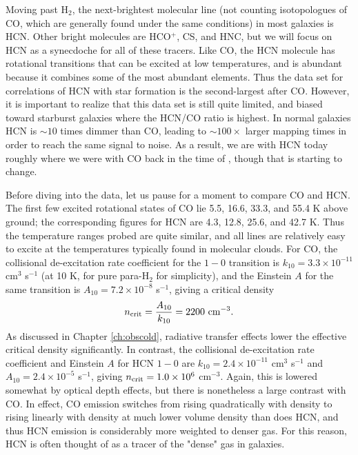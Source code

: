 Moving past H$_2$, the next-brightest molecular line (not counting isotopologues of CO, which are generally found under the same conditions) in most galaxies is HCN. Other bright molecules are HCO$^+$, CS, and HNC, but we will focus on HCN as a synecdoche for all of these tracers. Like CO, the HCN molecule has rotational transitions that can be excited at low temperatures, and is abundant because it combines some of the most abundant elements. Thus the data set for correlations of HCN with star formation is the second-largest after CO. However, it is important to realize that this data set is still quite limited, and biased toward starburst galaxies where the HCN/CO ratio is highest. In normal galaxies HCN is $\sim 10$ times dimmer than CO, leading to $\sim 100\times$ larger mapping times in order to reach the same signal to noise. As a result, we are with HCN today roughly where we were with CO back in the time of \citet{kennicutt98a}, though that is starting to change.

Before diving into the data, let us pause for a moment to compare CO and HCN. The first few excited rotational states of CO lie 5.5, 16.6, 33.3, and 55.4 K above ground; the corresponding figures for HCN are 4.3, 12.8, 25.6, and 42.7 K. Thus the temperature ranges probed are quite similar, and all lines are relatively easy to excite at the temperatures typically found in molecular clouds. For CO, the collisional de-excitation rate coefficient for the $1-0$ transition is $k_{10} = 3.3\times 10^{-11}$ cm$^3$ s$^{-1}$ (at 10 K, for pure para-H$_2$ for simplicity), and the Einstein $A$ for the same transition is $A_{10} = 7.2\times 10^{-8}$ s$^{-1}$, giving a critical density
\begin{equation}
n_{\rm crit} = \frac{A_{10}}{k_{10}} = 2200\mbox{ cm}^{-3}.
\end{equation}
As discussed in Chapter \ref{ch:obscold}, radiative transfer effects lower the effective critical density significantly. In contrast, the collisional de-excitation rate coefficient and Einstein $A$ for HCN $1-0$ are $k_{10} = 2.4\times 10^{-11}$ cm$^3$ s$^{-1}$ and $A_{10}=2.4\times 10^{-5}$ s$^{-1}$, giving $n_{\rm crit} = 1.0\times 10^6$ cm$^{-3}$. Again, this is lowered somewhat by optical depth effects, but there is nonetheless a large contrast with CO. In effect, CO emission switches from rising quadratically with density to rising linearly with density at much lower volume density than does HCN, and thus HCN emission is considerably more weighted to denser gas. For this reason, HCN is often thought of as a tracer of the "dense" gas in galaxies.

